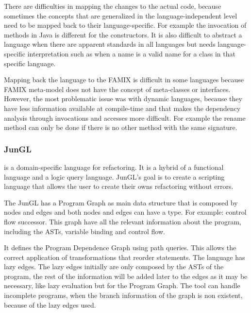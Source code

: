There are difficulties in mapping the changes to the actual code, because sometimes the concepts that are generalized in the language-independent level need to be mapped back to their language-specific.
For example the invocation of methods in Java is different for the constructors.
It is also difficult to abstract a language when there are apparent standards in all languages but needs language-specific interpretation such as when a name is a valid name for a class in that specific language.

Mapping back the language to the FAMIX is difficult in some languages because FAMIX meta-model does not have the concept of meta-classes or interfaces.
However, the most problematic issue was with dynamic languages, because they have less information available at compile-time and that makes the dependency analysis  through invocations and accesses more difficult. 
For example the rename method can only be done if there is no other method with the same signature.

\subsubsection{JunGL} %


\cite{verbaere2006jungl} is a domain-specific language for refactoring. 
It is a hybrid of a functional language and a logic query language. 
JunGL's goal is to create a scripting language that allows the user to create their owns refactoring without errors.

The JunGL has a Program Graph as main data structure that is composed by nodes and edges and both nodes and edges can have a type. 
For example: control flow successor. 
This graph have all the relevant information about the program, including the ASTs, variable binding and control flow.

It defines the Program Dependence Graph using path queries. 
This allows the correct application of transformations that reorder statements.
The language has lazy edges. 
The lazy edges initially are only composed by the ASTs of the program, the rest of the information will be added later to the edges as it may be necessary, like lazy evaluation but for the Program Graph.
The tool can handle incomplete programs, when the branch information of the graph is non existent, because of the lazy edges used. 

